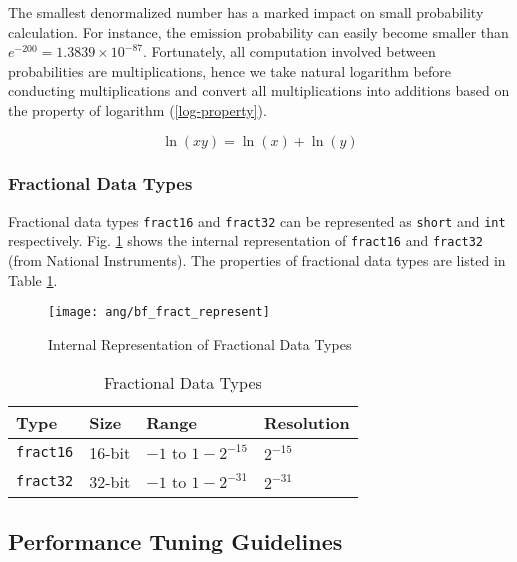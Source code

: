 The smallest denormalized number has a marked impact on small probability calculation. For instance, the emission probability can easily become smaller than $e^{-200} = 1.3839 \times 10^{-87}$. Fortunately, all computation involved between probabilities are multiplications, hence we take natural logarithm before conducting multiplications and convert all multiplications into additions based on the property of logarithm (\ref{log-property}).

\begin{equation}
\label{log-property}
\ln(xy) = \ln(x) + \ln(y)
\end{equation}


\subsubsection{Fractional Data Types}

Fractional data types \texttt{fract16} and \texttt{fract32} can be represented as \texttt{short} and \texttt{int} respectively. Fig. \ref{bf_fract_represent} shows the internal representation of \texttt{fract16} and \texttt{fract32} (from National Instruments). The properties of fractional data types are listed in Table \ref{fractional-data-types}.

\begin{figure}[H]
\centering
\texttt{[image: ang/bf\_fract\_represent]}
\caption{Internal Representation of Fractional Data Types}
\label{bf_fract_represent}
\end{figure}

\begin{table}[H]
\centering
\caption{Fractional Data Types}
\label{fractional-data-types}
\begin{tabu} to \textwidth {XXXX}
\toprule
Type &Size &Range &Resolution\\
\hline
\texttt{fract16} &16-bit &$-1$ to $1 - 2^{-15}$ &$2^{-15}$\\
\hline
\texttt{fract32} &32-bit &$-1$ to $1 - 2^{-31}$ &$2^{-31}$\\
\bottomrule
\end{tabu}
\end{table}


\subsection{Performance Tuning Guidelines}

